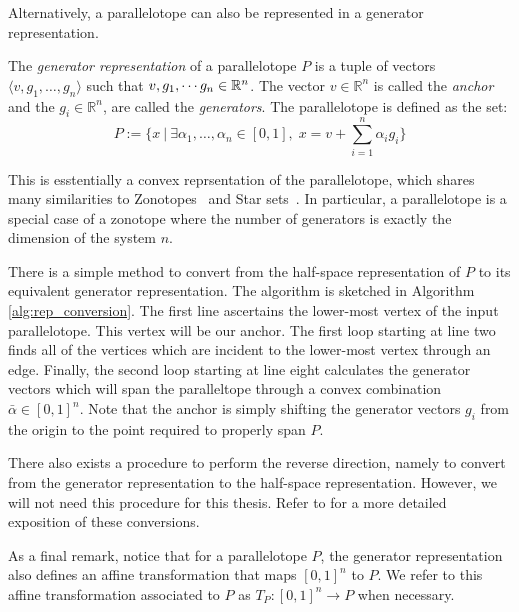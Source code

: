 \noindent Alternatively, a parallelotope can also be represented in a generator representation.
%
\begin{definition}
\label{def:generator_def}
The \emph{generator representation} of a parallelotope $P$ is a tuple of vectors $\langle v, g_1, \ldots, g_n\rangle$ such that $v,g_1, \cdots g_n \in {\mathbb{R}}^n$. The vector  $v \in \mathbb{R}^n$ is called the \emph{anchor} and the $g_i \in \mathbb{R}^n$, are called the \emph{generators}. The parallelotope is defined as the set:
$$
P := \{ x ~|~ \exists \alpha_1, \ldots, \alpha_n \in [0,1], \; x = v + \sum_{i=1}^n \alpha_i g_i \}
$$
\end{definition}
%
\begin{remark}
  \noindent This is esstentially a convex reprsentation of the parallelotope, which shares many similarities to Zonotopes~\cite{girard2005reachability,althoff2010computing} and Star sets~\cite{duggirala2016parsimonious}.
  In particular, a parallelotope is a special case of a zonotope where the number of generators is exactly the dimension of the system $n$.
\end{remark}
%
There is a simple method to convert from the half-space representation of $P$ to its equivalent generator representation. The algorithm is sketched in Algorithm \ref{alg:rep_conversion}.
%
The first line ascertains the lower-most vertex of the input parallelotope. This vertex will be our anchor. The first loop starting at line two finds all of the vertices which are incident to the lower-most vertex through an edge. Finally, the second loop starting at line eight calculates the generator vectors which will span the paralleltope through a convex combination $\bar{\alpha} \in [0,1]^n$. Note that the anchor is simply shifting the  generator vectors $g_i$ from the origin to the point required to properly span $P$.

There also exists a procedure to perform the reverse direction, namely to convert from the generator representation to the half-space representation. However, we will not need this procedure for this thesis. Refer to \cite{dang2014parameter} for a more detailed exposition of these conversions.

As a final remark, notice that for a parallelotope $P$, the generator representation also defines an affine transformation that maps $[0,1]^{n}$ to $P$.
%
We refer to this affine transformation associated to $P$ as $T_P:[0,1]^n \rightarrow P$ when necessary.



